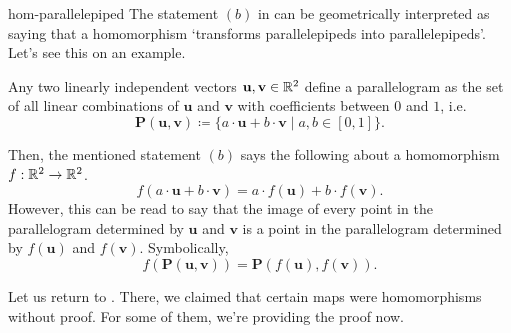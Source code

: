 \begin{remark}{}{hom-parallelepiped}
 The statement $(b)$ in  can be
 geometrically interpreted as saying that a homomorphism `transforms
 parallelepipeds into parallelepipeds'. Let's see this on an example.

 Any two linearly independent vectors $\mathbf{u},\mathbf{v} \in \mathbb{R}^2$ define a
 parallelogram as the set of all linear combinations of $\mathbf{u}$ and
 $\mathbf{v}$ with coefficients between $0$ and $1$, i.e.
 \[
  \mathbf{P}(\mathbf{u},\mathbf{v}) \coloneqq \{a \cdot \mathbf{u} + b \cdot
  \mathbf{v} \mid a,b \in [0,1]\}.
 \]
 \begin{center}
 \end{center}
 Then, the mentioned statement $(b)$ says the following about a homomorphism
 $f:\mathbb{R}^2 \to \mathbb{R}^2$.
 \[
  f(a \cdot \mathbf{u} + b \cdot \mathbf{v}) = a \cdot f(\mathbf{u}) + b \cdot
  f(\mathbf{v}).
 \]
 However, this can be read to say that the image of every point in the
 parallelogram determined by $\mathbf{u}$ and $\mathbf{v}$ is a point in the
 parallelogram determined by $f(\mathbf{u})$ and $f(\mathbf{v})$. Symbolically,
 \[
  f(\mathbf{P}(\mathbf{u},\mathbf{v})) =
  \mathbf{P}(f(\mathbf{u}),f(\mathbf{v})).
 \]
\end{remark}

Let us return to . There, we claimed that certain maps
were homomorphisms without proof. For some of them, we're providing the proof
now.

